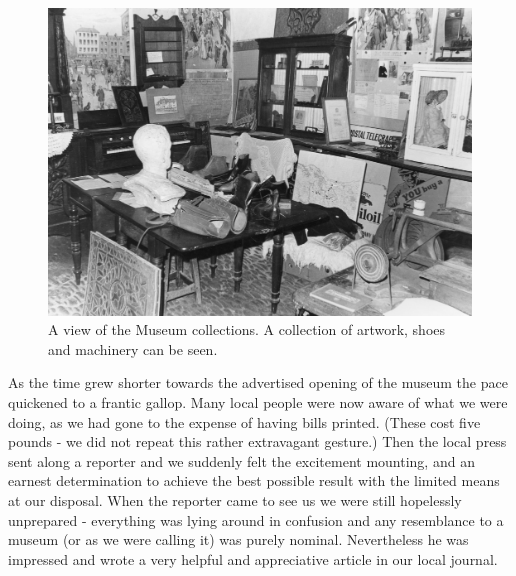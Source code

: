 \begin{figure}[]
     \includegraphics[width=1\textwidth]{figures/Museum2}
     \caption{A view of the Museum collections. A collection of artwork, shoes and machinery can be seen.}
     \label{fig:Museum2}
\end{figure}

As the time grew shorter towards the advertised opening of the museum the pace quickened to a frantic gallop. Many local people were now aware of what we were doing, as we had gone to the expense of having bills printed. (These cost five pounds - we did not repeat this rather extravagant gesture.) Then the local press sent along a reporter and we suddenly felt the excitement mounting, and an earnest determination to achieve the best possible result with the limited means at our disposal. When the reporter came to see us we were still hopelessly unprepared - everything was lying around in confusion and any resemblance to a museum (or  as we were calling it) was purely nominal. Nevertheless he was impressed and wrote a very helpful and appreciative article in our local journal. 

